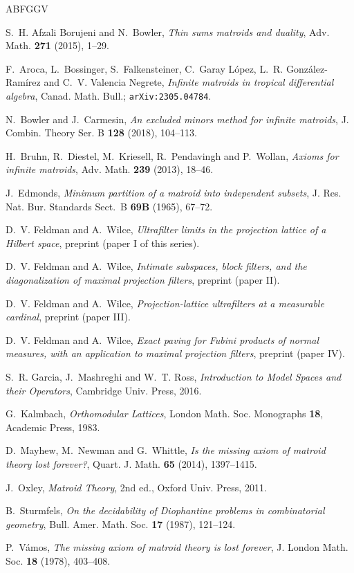 \documentclass[11pt,reqno]{amsart}
\theoremstyle{definition}
\begin{document}
\begin{thebibliography}{ABFGGV}

S.~H. Afzali Borujeni and N.~Bowler,
\emph{Thin sums matroids and duality},
Adv. Math. \textbf{271} (2015), 1--29.

F.~Aroca, L.~Bossinger, S.~Falkensteiner, C.~Garay L\'opez,
L.~R. Gonz\'alez-Ram\'irez and C.~V. Valencia Negrete,
\emph{Infinite matroids in tropical differential algebra},
Canad. Math. Bull.; \texttt{arXiv:2305.04784}.

N.~Bowler and J.~Carmesin,
\emph{An excluded minors method for infinite matroids},
J. Combin. Theory Ser. B \textbf{128} (2018), 104--113.

H.~Bruhn, R.~Diestel, M.~Kriesell, R.~Pendavingh and P.~Wollan,
\emph{Axioms for infinite matroids},
Adv. Math. \textbf{239} (2013), 18--46.

J.~Edmonds,
\emph{Minimum partition of a matroid into independent subsets},
J. Res. Nat. Bur. Standards Sect.~B \textbf{69B} (1965), 67--72.

D.~V. Feldman and A.~Wilce, \emph{Ultrafilter limits in the projection lattice
of a Hilbert space}, preprint (paper I of this series).

D.~V. Feldman and A.~Wilce, \emph{Intimate subspaces, block filters, and the
diagonalization of maximal projection filters}, preprint (paper II).

D.~V. Feldman and A.~Wilce, \emph{Projection-lattice ultrafilters at a
measurable cardinal}, preprint (paper III).

D.~V. Feldman and A.~Wilce, \emph{Exact paving for Fubini products of normal
measures, with an application to maximal projection filters}, preprint
(paper IV).

S.~R. Garcia, J.~Mashreghi and W.~T. Ross,
\emph{Introduction to Model Spaces and their Operators},
Cambridge Univ. Press, 2016.

G.~Kalmbach, \emph{Orthomodular Lattices},
London Math. Soc. Monographs \textbf{18}, Academic Press, 1983.

D.~Mayhew, M.~Newman and G.~Whittle,
\emph{Is the missing axiom of matroid theory lost forever?},
Quart. J. Math. \textbf{65} (2014), 1397--1415.

J.~Oxley, \emph{Matroid Theory}, 2nd ed., Oxford Univ. Press, 2011.

B.~Sturmfels,
\emph{On the decidability of Diophantine problems in combinatorial geometry},
Bull. Amer. Math. Soc. \textbf{17} (1987), 121--124.

P.~V\'amos,
\emph{The missing axiom of matroid theory is lost forever},
J. London Math. Soc. \textbf{18} (1978), 403--408.

\end{thebibliography}
\end{document}
